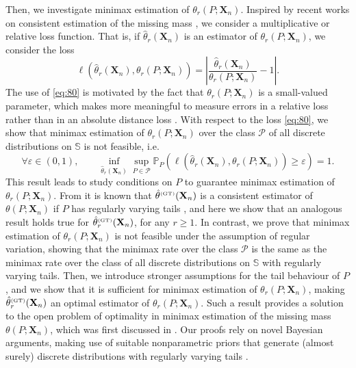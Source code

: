\documentclass{article}
\newcommand{\1}{\boldsymbol{1}}
\theoremstyle{plain}
\begin{document}
Then, we investigate minimax estimation of $\theta_{r}(P;\mathbf{X}_{n})$. Inspired by recent works on consistent estimation of the missing mass \cite{Oha(12),Mos(15), Fad(18)}, we consider a multiplicative or relative loss function. That is, if $\hat{\theta}_{r}(\mathbf{X}_{n})$ is an estimator of $\theta_{r}(P;\mathbf{X}_{n})$, we consider the loss
\begin{equation}\label{eq:80}
  \ell(\hat{\theta}_r(\mathbf{X}_{n}),\theta_r(P;\mathbf{X}_{n}))=\left|\frac{\hat{\theta}_r(\mathbf{X}_n)}{\theta_r(P;\mathbf{X}_n)} - 1\right|.
\end{equation}
The use of \eqref{eq:80} is motivated by the fact that $\theta_{r}(P;\mathbf{X}_{n})$ is a small-valued parameter, which makes more meaningful to measure errors in a relative loss rather than in an absolute distance loss \cite{Oha(12)}. With respect to the loss \eqref{eq:80}, we show that minimax estimation of $\theta_{r}(P;\mathbf{X}_{n})$ over the class $\mathcal{P}$ of all discrete distributions on $\mathbb{S}$ is not feasible, i.e.
\begin{displaymath}
  \forall \varepsilon \in (0,1),\qquad
\inf_{\hat{\theta}_{r}(\mathbf{X}_{n})}\sup_{P\in\mathcal{P}}\mathbb{P}_{P}(\ell(\hat{\theta}_r(\mathbf{X}_{n}),\theta_r(P;\mathbf{X}_{n}))\geq \varepsilon)=1.
\end{displaymath} 
This result leads to study conditions on $P$ to guarantee minimax estimation of $\theta_{r}(P;\mathbf{X}_{n})$. From \cite{Oha(12),Fad(18)} it is known that $\hat{\theta}^{\text{\tiny{(GT)}}}(\mathbf{X}_{n})$ is a consistent estimator of $\theta(P;\mathbf{X}_{n})$ if $P$ has regularly varying tails \cite{Bin(87),Gne(07)}, and here we show that an analogous result holds true for $\hat{\theta}_{r}^{\text{\tiny{(GT)}}}(\mathbf{X}_{n})$, for any $r\geq1$. In contrast, we prove that minimax estimation of $\theta_r(P;\mathbf{X}_{n})$ is not feasible under the assumption of regular variation, showing that the minimax rate over the class $\mathcal{P}$ is the same as the minimax rate over the class of all discrete distributions on $\mathbb{S}$ with regularly varying tails. Then, we introduce stronger assumptions for the tail behaviour of $P$, and we show that it is sufficient for minimax estimation of $\theta_r(P;\mathbf{X}_{n})$, making $\hat{\theta}_{r}^{\text{\tiny{(GT)}}}(\mathbf{X}_{n})$ an optimal estimator of $\theta_{r}(P;\mathbf{X}_{n})$. Such a result provides a solution to the open problem of optimality in minimax estimation of the missing mass $\theta(P;\mathbf{X}_{n})$, which was first discussed in \cite{Fad(18)}. Our proofs rely on novel Bayesian arguments, making use of suitable nonparametric priors that generate (almost surely) discrete distributions with regularly varying tails \cite{Pit(97),Gne(07)}.
\end{document}
